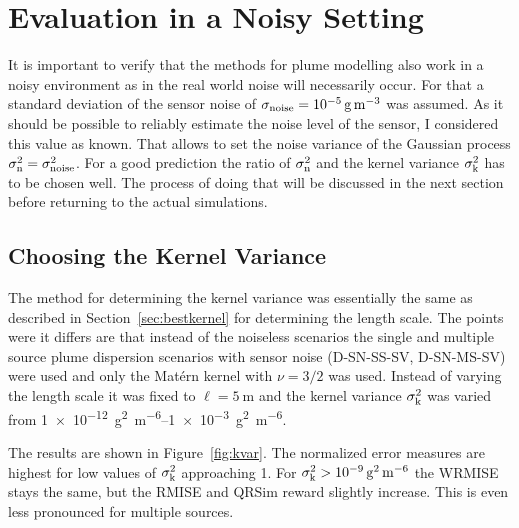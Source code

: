 \section{Evaluation in a Noisy Setting}\label{sec:noisy}
It is important to verify that the methods for plume modelling also work in 
a noisy environment as in the real world noise will necessarily occur. For that 
a standard deviation of the sensor noise of $\sigma_{\mathrm{noise}} 
= \SI{1e-5}{\gram\per\meter\cubed}$ was assumed. As it should be possible to 
reliably estimate the noise level of the sensor, I considered this value as 
known. That allows to set the noise variance of the Gaussian process 
$\sigma_{\mathrm{n}}^2 = \sigma_{\mathrm{noise}}^2$. For a good prediction the ratio of 
$\sigma_{\mathrm{n}}^2$ and the kernel variance $\sigma_{\mathrm{k}}^2$ has to be chosen 
well. The process of doing that will be discussed in the next section before 
returning to the actual simulations.

\subsection{Choosing the Kernel Variance}
The method for determining the kernel variance was essentially the same as 
described in Section~\ref{sec:bestkernel} for determining the length scale. The 
points were it differs are that instead of the noiseless scenarios the single 
and multiple source plume dispersion scenarios with sensor noise (D-SN-SS-SV, 
D-SN-MS-SV) were used and only the Mat\'ern kernel with $\nu = 3/2$ was used.  
Instead of varying the length scale it was fixed to $\ell = \SI{5}{\meter}$ and 
the kernel variance $\sigma_{\mathrm{k}}^2$ was varied from 
\SIrange{1e-12}{1e-3}{\gram\squared\per\meter\tothe{6}}.

The results are shown in Figure~\ref{fig:kvar}. The normalized error measures 
are highest for low values of $\sigma_{\mathrm{k}}^2$ approaching 1. For 
$\sigma\ped{k}^2 > \SI{1e-9}{\gram\squared\per\meter\tothe{6}}$ the WRMISE stays 
the same, but the RMISE and QRSim reward slightly increase. This is even less 
pronounced for multiple sources.


